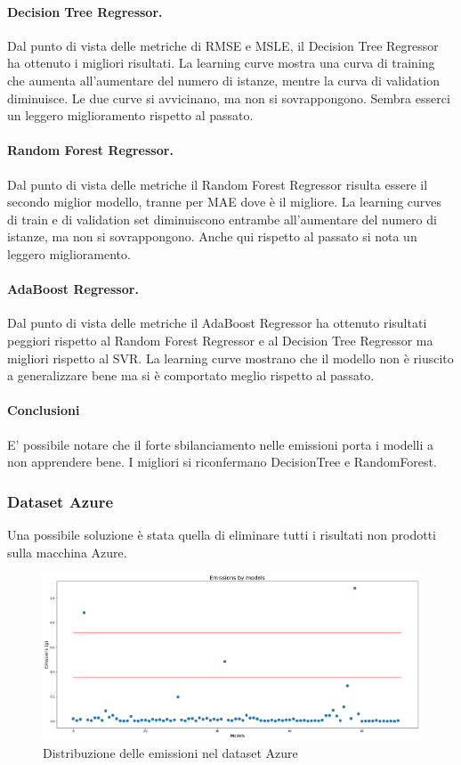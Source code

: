 \paragraph{\textbf{Decision Tree Regressor}.}
Dal punto di vista delle metriche di RMSE e MSLE, il Decision Tree Regressor ha ottenuto i migliori risultati. 
La learning curve mostra una curva di training che aumenta all'aumentare del numero di istanze, mentre la curva di validation diminuisce. Le due curve si avvicinano, ma non si sovrappongono. Sembra esserci un leggero miglioramento rispetto al passato.
\paragraph{\textbf{Random Forest Regressor}.}
Dal punto di vista delle metriche il Random Forest Regressor risulta essere il secondo miglior modello, tranne per MAE dove è il migliore.
La learning curves di train e di validation set diminuiscono entrambe all'aumentare del numero di istanze, ma non si sovrappongono. Anche qui rispetto al passato si nota un leggero miglioramento.
\paragraph{\textbf{AdaBoost Regressor}.}
Dal punto di vista delle metriche il AdaBoost Regressor ha ottenuto risultati peggiori rispetto al Random Forest Regressor e al Decision Tree Regressor ma migliori rispetto al SVR.
La learning curve mostrano che il modello non è riuscito a generalizzare bene ma si è comportato meglio rispetto al passato.


\paragraph{\textbf{Conclusioni}} E' possibile notare che il forte sbilanciamento nelle emissioni porta i modelli a non apprendere bene. I migliori si riconfermano DecisionTree e RandomForest.


\subsubsection{Dataset Azure}

\noindent Una possibile soluzione è stata quella di eliminare tutti i risultati non prodotti sulla macchina Azure.

\begin{figure}[H]
    \centering
    \includegraphics[scale=0.25]{images/nuova-situazione2.png}
    \caption{Distribuzione delle emissioni nel dataset Azure}
\end{figure}


